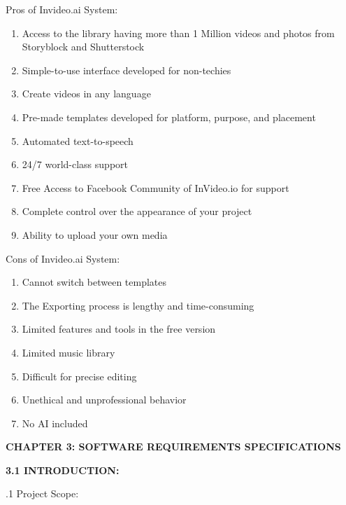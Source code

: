 \documentclass[12pt]{article}
\begin{document}
\justify
Pros of Invideo.ai System:
\begin{enumerate}
\item Access to the library having more than 1 Million videos and photos from Storyblock and Shutterstock 
\item Simple-to-use interface developed for non-techies 
\item Create videos in any language 
\item Pre-made templates developed for platform, purpose, and placement 
\item Automated text-to-speech 
\item 24/7 world-class support 
\item Free Access to Facebook Community of InVideo.io for support 
\item Complete control over the appearance of your project 
\item Ability to upload your own media 

\end{enumerate}
\justify
Cons of Invideo.ai System:
\begin{enumerate}
\item Cannot switch between templates
\item The Exporting process is lengthy and time-consuming
\item Limited features and tools in the free version
\item Limited music library 
\item Difficult for precise editing
\item Unethical and unprofessional behavior
\item No AI included

\end{enumerate}

\pagebreak{}


\begin{center} \fontsize{14pt}{14pt} \textbf{CHAPTER 3: SOFTWARE REQUIREMENTS
SPECIFICATIONS } \end{center}


\justify \fontsize{12}{12} \textbf{3.1 INTRODUCTION:}

.1 Project Scope: \\

\justify
\end{document}

